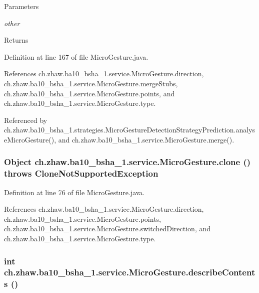 \begin{DoxyParams}{Parameters}
\item[{\em other}]\end{DoxyParams}
\begin{DoxyReturn}{Returns}

\end{DoxyReturn}


Definition at line 167 of file MicroGesture.java.

References ch.zhaw.ba10\_\-bsha\_\-1.service.MicroGesture.direction, ch.zhaw.ba10\_\-bsha\_\-1.service.MicroGesture.mergeStubs, ch.zhaw.ba10\_\-bsha\_\-1.service.MicroGesture.points, and ch.zhaw.ba10\_\-bsha\_\-1.service.MicroGesture.type.

Referenced by ch.zhaw.ba10\_\-bsha\_\-1.strategies.MicroGestureDetectionStrategyPrediction.analyseMicroGesture(), and ch.zhaw.ba10\_\-bsha\_\-1.service.MicroGesture.merge().\hypertarget{classch_1_1zhaw_1_1ba10__bsha__1_1_1service_1_1MicroGesture_a8fcc5afd682a4e6f39d6a813903e483f}{
\subsubsection[{clone}]{\setlength{\rightskip}{0pt plus 5cm}Object ch.zhaw.ba10\_\-bsha\_\-1.service.MicroGesture.clone ()  throws CloneNotSupportedException }}
\label{classch_1_1zhaw_1_1ba10__bsha__1_1_1service_1_1MicroGesture_a8fcc5afd682a4e6f39d6a813903e483f}


Definition at line 76 of file MicroGesture.java.

References ch.zhaw.ba10\_\-bsha\_\-1.service.MicroGesture.direction, ch.zhaw.ba10\_\-bsha\_\-1.service.MicroGesture.points, ch.zhaw.ba10\_\-bsha\_\-1.service.MicroGesture.switchedDirection, and ch.zhaw.ba10\_\-bsha\_\-1.service.MicroGesture.type.\hypertarget{classch_1_1zhaw_1_1ba10__bsha__1_1_1service_1_1MicroGesture_a907d378703ba728992346b911b127339}{
\subsubsection[{describeContents}]{\setlength{\rightskip}{0pt plus 5cm}int ch.zhaw.ba10\_\-bsha\_\-1.service.MicroGesture.describeContents ()}}
\label{classch_1_1zhaw_1_1ba10__bsha__1_1_1service_1_1MicroGesture_a907d378703ba728992346b911b127339}


